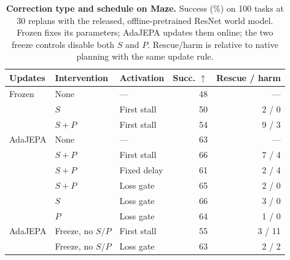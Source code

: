 \begin{table}[t]
\centering
\caption{\textbf{Correction type and schedule on Maze.} Success (\%) on 100 tasks at 30 replans with the released, offline-pretrained ResNet world model. Frozen fixes its parameters; AdaJEPA updates them online; the two freeze controls disable both $S$ and $P$. Rescue/harm is relative to native planning with the same update rule.}
\label{tab:maze-controls}
\small
\setlength{\tabcolsep}{2.2pt}
\begin{tabular}{lllrr}
\toprule
Updates & Intervention & Activation & Succ. $\uparrow$ & Rescue / harm\\
\midrule
Frozen & None &---&48&---\\
& $S$ &First stall&50&2 / 0\\
& $S{+}P$ &First stall&54&9 / 3\\
\midrule
AdaJEPA & None &---&63&---\\
& $S{+}P$ &First stall&66&7 / 4\\
& $S{+}P$ &Fixed delay&61&2 / 4\\
& $S{+}P$ &Loss gate&65&2 / 0\\
& $S$ &Loss gate&66&3 / 0\\
& $P$ &Loss gate&64&1 / 0\\
\midrule
AdaJEPA & Freeze, no $S/P$ &First stall&55&3 / 11\\
& Freeze, no $S/P$ &Loss gate&63&2 / 2\\
\bottomrule
\end{tabular}
\end{table}
